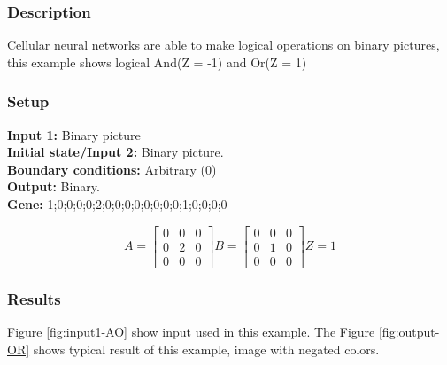 \subsubsection{Description}
Cellular neural networks are able to make logical operations on binary pictures, this example shows logical And(Z = -1) and Or(Z = 1)
\subsubsection{Setup}

\textbf{Input 1:} Binary picture\\
\textbf{Initial state/Input 2:} Binary picture.\\
\textbf{Boundary conditions:} Arbitrary (0)\\
\textbf{Output:} Binary.\\
\textbf{Gene:} 1;0;0;0;0;2;0;0;0;0;0;0;0;0;1;0;0;0;0\\


\begin{minipage}{0.9\linewidth}
\begin{equation}
A =
\begin{bmatrix}
 0 &  0 &  0 \\
  0 &  2 &  0 \\
  0 &  0 &  0
\end{bmatrix}
B =
\begin{bmatrix}
 0 & 0 & 0 \\
 0 & 1 & 0 \\
 0 & 0 & 0
\end{bmatrix}
Z = 1
\end{equation}
\end{minipage}

\subsubsection{Results}
Figure \ref{fig:input1-AO} show input used in this example. The Figure \ref{fig:output-OR} shows typical result of this example, image with negated colors. \\

